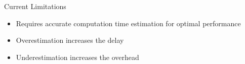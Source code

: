 \documentclass[final]{beamer}
\newlength{\onecolwid}
\begin{document}
\begin{frame}[t]
\begin{columns}[t]
\begin{column}{\onecolwid}
\begin{block}{Current Limitations}
\begin{itemize}
 \item Requires accurate computation time estimation for optimal performance
 \item Overestimation increases the delay
 \item Underestimation increases the overhead
\end{itemize}

\end{block}


\end{column} %

\end{columns} %

\end{frame} %
\end{document}
